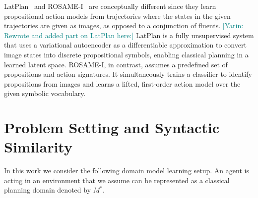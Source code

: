 \documentclass{article}
\theoremstyle{definition}
\theoremstyle{remark}
\newcommand{\realm}{\ensuremath{M^*}\xspace}
\newcommand{\roni}[1]{{\textcolor{red}{[Roni: #1]}}}
\newcommand{\mauro}[1]{{\textcolor{green}{[Mauro: #1]}}}
\newcommand{\yarin}[1]{{\textcolor{teal}{[Yarin: #1]}}}
\newcommand{\gregor}[1]{{\textcolor{orange}{[Gregor: #1]}}}
\begin{document}
LatPlan~\citep{asai2018classical} and ROSAME-I~\citep{xi2024neuro} are conceptually different since they learn propositional action models from trajectories where the states in the given trajectories are given as images, as opposed to a conjunction of fluents. 
\yarin{Rewrote and added part on LatPlan here:}
LatPlan is a fully unsupervised system that uses a variational autoencoder as a differentiable approximation to convert image states into discrete propositional symbols, enabling classical planning in a learned latent space.
ROSAME-I, in contrast, assumes a predefined set of propositions and action signatures. It simultaneously trains a classifier to identify propositions from images and learns a lifted, first-order action model over the given symbolic vocabulary.






\section{Problem Setting and Syntactic Similarity}
\label{sec:problem-setting}


In this work we consider the following domain model learning setup. 
An agent is acting in an environment that we assume can be represented as a classical planning domain denoted by $\realm$. 
\end{document}
